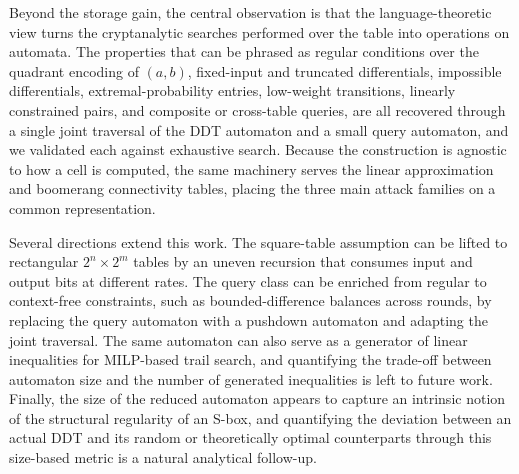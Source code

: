 \documentclass[runningheads]{llncs}
\begin{document}
Beyond the storage gain, the central observation is that the language-theoretic
view turns the cryptanalytic searches performed over the table into operations on
automata. The properties that can be phrased as regular conditions over the
quadrant encoding of $(a,b)$, fixed-input and truncated differentials, impossible
differentials, extremal-probability entries, low-weight transitions, linearly
constrained pairs, and composite or cross-table queries, are all recovered
through a single joint traversal of the DDT automaton and a small query automaton,
and we validated each against exhaustive search. Because the construction is
agnostic to how a cell is computed, the same machinery serves the linear
approximation and boomerang connectivity tables, placing the three main attack
families on a common representation.

Several directions extend this work. The square-table assumption can be lifted to
rectangular $2^{n}\times 2^{m}$ tables by an uneven recursion that consumes input
and output bits at different rates. The query class can be enriched from regular to
context-free constraints, such as bounded-difference balances across rounds, by
replacing the query automaton with a pushdown automaton and adapting the joint
traversal. The same automaton can also serve as a generator of linear inequalities
for MILP-based trail search, and quantifying the trade-off between automaton size
and the number of generated inequalities is left to future work. Finally, the size
of the reduced automaton appears to capture an intrinsic notion of the structural
regularity of an S-box, and quantifying the deviation between an actual DDT and
its random or theoretically optimal counterparts through this size-based metric
is a natural analytical follow-up.
\end{document}
